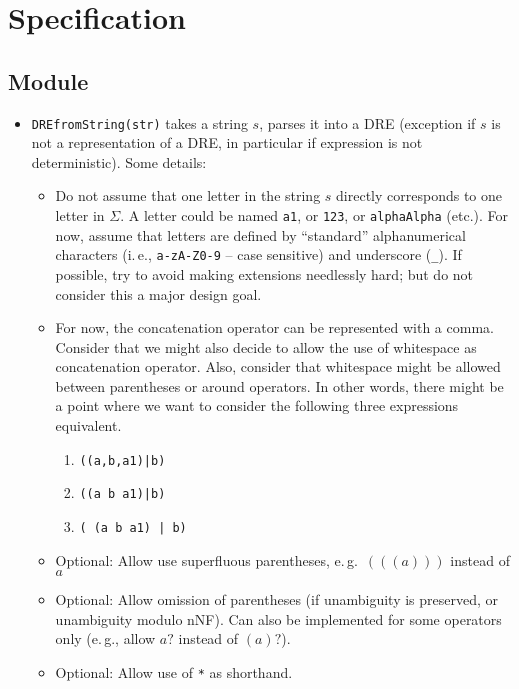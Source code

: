 \documentclass[a4paper,11pt, svgnames,titlepage]{article}
\DeclareMathOperator{\incomp}{\#}
\begin{document}
\section{Specification}\label{sec:spec}
\subsection{Module}\label{sec:des:mod}
\begin{itemize}
	\item\texttt{DREfromString(str)} takes a string $s$, parses it into a DRE (exception if $s$ is not a representation of a DRE, in particular if expression is not deterministic). Some details:
	\begin{itemize}
		\item Do not assume that one letter in the string $s$ directly corresponds to one letter in $\Sigma$. A letter could be named \texttt{a1}, or \texttt{123}, or \texttt{alphaAlpha} (etc.). For now, assume that letters are defined by ``standard'' alphanumerical characters (i.\,e., \texttt{a-zA-Z0-9} -- case sensitive) and underscore (\texttt{\_}). If possible, try to avoid making extensions needlessly hard; but do not consider this a major design goal.
		\item For now, the concatenation operator can be represented with a comma. Consider that we might also decide to allow the use of whitespace as concatenation operator. Also, consider that whitespace might be allowed between parentheses or around operators. In other words, there might be a point where we want to consider the following three expressions equivalent. \begin{enumerate}
			\item \texttt{((a,b,a1)|b)}
			\item \texttt{((a b a1)|b)}
			\item \texttt{( (a b a1) | b)}
		\end{enumerate} 
		\item Optional: Allow use superfluous parentheses, e.\,g.\ $(((a)))$ instead of $a$
		\item Optional: Allow omission of parentheses (if unambiguity is preserved, or unambiguity modulo nNF). Can also be implemented for some operators only (e.\,g., allow $a?$ instead of $(a)?$).
		\item Optional: Allow use of \texttt{*} as shorthand. 
	\end{itemize}

\end{itemize}
\end{document}
